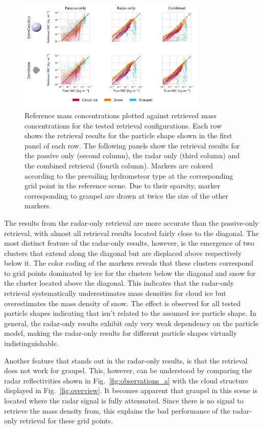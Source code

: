 \documentclass[journal abbreviation, manuscript]{copernicus}
\begin{document}
\begin{figure}
\centering
\includegraphics[width = 0.8\textwidth]{../plots/results_scatter_a_1}
\caption{Reference mass concentrations plotted against retrieved mass
  concentrations for the tested retrieval configurations. Each row shows the
  retrieval results for the particle shape shown in the first panel of each row.
  The following panels show the retrieval results for the passive only (second
  column), the radar only (third column) and the combined retrieval (fourth
  column). Markers are colored according to the prevailing hydrometeor type at
  the corresponding grid point in the reference scene. Due to their sparsity,
  marker corresponding to graupel are drawn at twice the size of the other
  markers.}
\label{fig:results_scatter_a_1}
\end{figure}

The results from the radar-only retrieval are more accurate than the
passive-only retrieval, with almost all retrieval results located fairly close
to the diagonal. The most distinct feature of the radar-only results, however,
is the emergence of two clusters that extend along the diagonal but are
displaced above respectively below it. The color coding of the markers reveals
that these clusters correspond to grid points dominated by ice for the clusters
below the diagonal and snow for the cluster located above the diagonal. This
indicates that the radar-only retrieval systematically underestimates mass
densities for cloud ice but overestimates the mass density of snow. The effect
is observed for all tested particle shapes indicating that isn't related to
the assumed ice particle shape. In general, the radar-only results exhibit only
very weak dependency on the particle model, making the radar-only results for
different particle shapes virtually indistinguishable.

Another feature that stands out in the radar-only results, is that the retrieval
does not work for graupel. This, however, can be understood by comparing the
radar reflectivities shown in Fig.~\ref{fig:observations_a} with the cloud
structure displayed in Fig.~\ref{fig:overview}. It becomes apparent that graupel
in this scene is located where the radar signal is fully attenuated. Since there
is no signal to retrieve the mass density from, this explains the bad
performance of the radar-only retrieval for these grid points.
\end{document}
